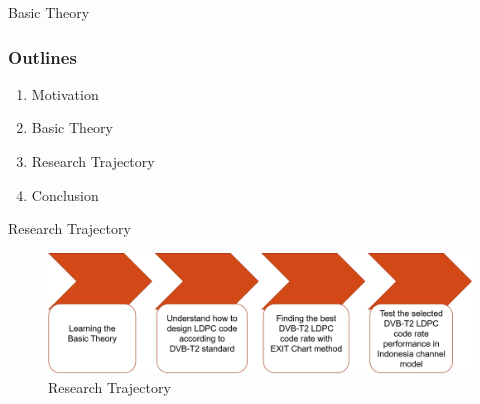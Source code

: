 \documentclass{beamer}
\let\footnotesize\tiny
\begin{document}
\begin{frame}[shrink=34]{Basic Theory}
\begin{multicols}{2}
  \vfill \null
\end{multicols}

\end{frame}

\begin{frame}
\frametitle{Outlines}
\begin{enumerate}
\item Motivation
\item Basic Theory
\item \alert<+> {Research Trajectory}
\item Conclusion 
\end{enumerate}
\end{frame}
\begin{frame}{Research Trajectory}
\begin{center}
\begin{figure}\vspace{-2cm}\hspace{10cm}
\includegraphics[scale=0.37]{pict/traject.png}
\caption*{\tiny Research Trajectory}
\end{figure}
\end{center}
\end{frame}
\end{document}
